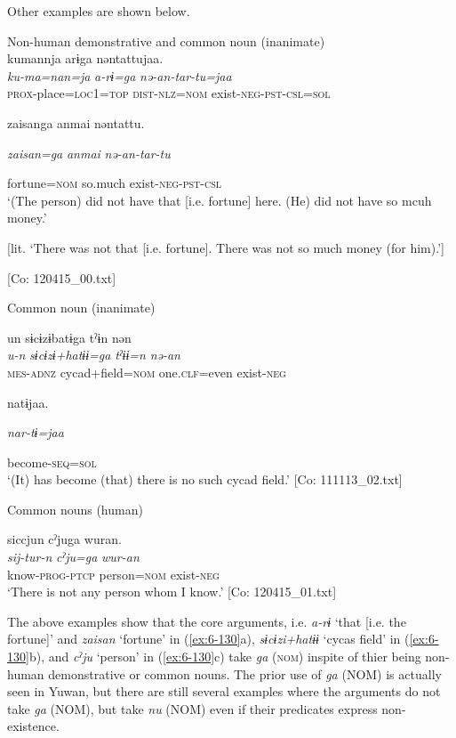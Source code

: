 \begin{table}
\begin{styleBeschriftung}
Other examples are shown below.

\ea\label{ex:6-130}
 Non-human demonstrative and common noun (inanimate)\\

 \ea {\TM}  kumannja  arɨga  nəntattujaa.\\
\glll \textit{ku-ma=nan=ja}  \textit{a-rɨ=ga}  \textit{nə-an-tar-tu=jaa}\\
\textsc{prox}-place=\textsc{loc}1=\textsc{top}  \textsc{dist}-\textsc{nlz}=\textsc{nom}  exist-\textsc{neg}-\textsc{pst}-\textsc{csl}=\textsc{sol}

      {\textbar}zaisan{\textbar}ga  anmai  nəntattu.

      \textit{zaisan=ga}  \textit{anmai}  \textit{nə-an-tar-tu}

      fortune=\textsc{nom}  so.much  exist-\textsc{neg}-\textsc{pst}-\textsc{csl}\\
\glt ‘(The person) did not have that [i.e. fortune] here. (He) did not have so mcuh money.’

[lit. ‘There was not that [i.e. fortune]. There was not so much money (for him).’]

      [Co: 120415\_00.txt]
\z

  Common noun (inanimate)

\ex {\TM}  un  sɨcɨzɨbatɨga  tˀɨn  nən\\
\glll \textit{u-n}  \textit{sɨcɨzɨ+hatɨɨ=ga}  \textit{tˀɨɨ=n}  \textit{nə-an}\\
\textsc{mes}-\textsc{adnz}  cycad+field=\textsc{nom}  one.\textsc{clf}=even  exist-\textsc{neg}

      natɨjaa.

      \textit{nar-tɨ=jaa}

      become-\textsc{seq}=\textsc{sol}\\
\glt ‘(It) has become (that) there is no such cycad field.’ [Co: 111113\_02.txt]
\z

  Common nouns (human)

\ex {\TM}  siccjun  cˀjuga  wuran.\\
\glll \textit{sij-tur-n}  \textit{cˀju=ga}  \textit{wur-an}\\
know-\textsc{prog}-\textsc{ptcp}  person=\textsc{nom}  exist-\textsc{neg}\\
\glt ‘There is not any person whom I know.’ [Co: 120415\_01.txt]
\z

The above examples show that the core arguments, i.e. \textit{a-rɨ} ‘that [i.e. the fortune]’ and \textit{zaisan} ‘fortune’ in (\ref{ex:6-130}a), \textit{sɨcɨzi+hatɨɨ} ‘cycas field’ in (\ref{ex:6-130}b), and \textit{cˀju} ‘person’ in (\ref{ex:6-130}c) take \textit{ga} (\textsc{nom}) inspite of thier being non-human demonstrative or common nouns. The prior use of \textit{ga} (NOM) is actually seen in Yuwan, but there are still several examples where the arguments do not take \textit{ga} (NOM), but take \textit{nu} (NOM) even if their predicates express non-existence.


\end{styleBeschriftung}
\end{table}
